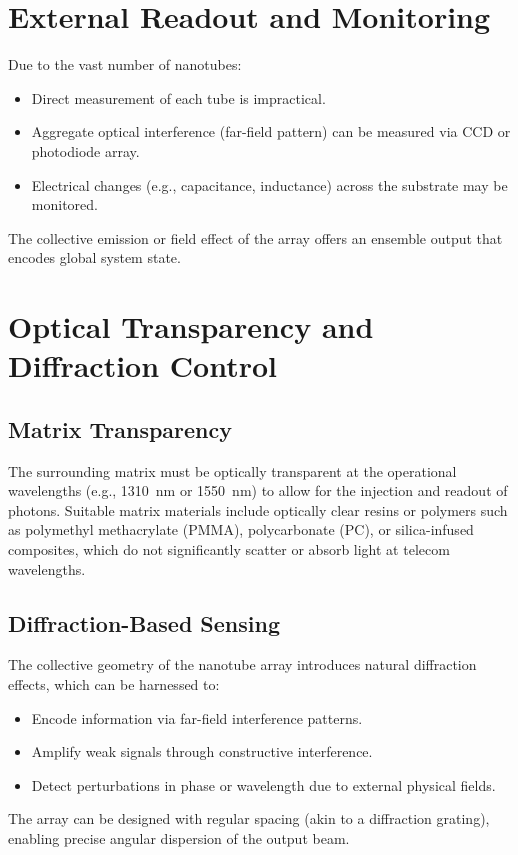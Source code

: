 \documentclass[11pt]{article}
\begin{document}
	\section{External Readout and Monitoring}
	Due to the vast number of nanotubes:
	\begin{itemize}
		\item Direct measurement of each tube is impractical.
		\item Aggregate optical interference (far-field pattern) can be measured via CCD or photodiode array.
		\item Electrical changes (e.g., capacitance, inductance) across the substrate may be monitored.
	\end{itemize}
	The collective emission or field effect of the array offers an ensemble output that encodes global system state.
	
	\section{Optical Transparency and Diffraction Control}
	\subsection{Matrix Transparency}
	The surrounding matrix must be optically transparent at the operational wavelengths (e.g., \SI{1310}{\nano\meter} or \SI{1550}{\nano\meter}) to allow for the injection and readout of photons. Suitable matrix materials include optically clear resins or polymers such as polymethyl methacrylate (PMMA), polycarbonate (PC), or silica-infused composites, which do not significantly scatter or absorb light at telecom wavelengths.
	
	\subsection{Diffraction-Based Sensing}
	The collective geometry of the nanotube array introduces natural diffraction effects, which can be harnessed to:
	\begin{itemize}
		\item Encode information via far-field interference patterns.
		\item Amplify weak signals through constructive interference.
		\item Detect perturbations in phase or wavelength due to external physical fields.
	\end{itemize}
	The array can be designed with regular spacing (akin to a diffraction grating), enabling precise angular dispersion of the output beam.
	
\end{document}
